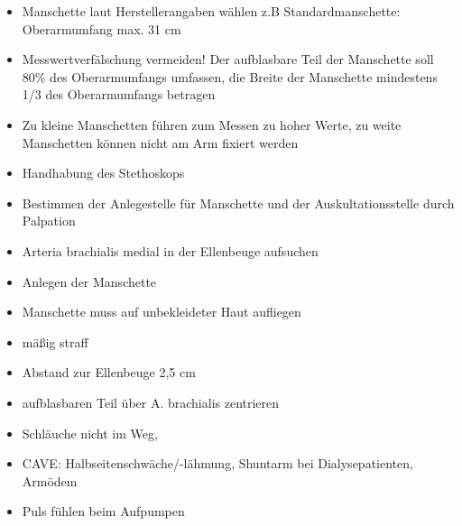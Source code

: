 \documentclass{article}
\begin{document}
\begin{itemize}
\item Manschette laut Herstellerangaben w\"ahlen z.B Standardmanschette:
Oberarmumfang max. 31 cm

\item Messwertverf\"alschung vermeiden! Der aufblasbare Teil der
Manschette soll 80\% des Oberarmumfangs umfassen, die Breite der
Manschette mindestens 1/3 des Oberarmumfangs betragen

\item Zu kleine Manschetten f\"uhren zum Messen zu hoher Werte, zu weite
Manschetten k\"onnen nicht am Arm fixiert werden

\end{itemize}
\begin{itemize}
\item Handhabung des Stethoskops

\item Bestimmen der Anlegestelle f\"ur Manschette und der
Auskultationsstelle durch Palpation

\end{itemize}
\begin{itemize}
\item Arteria brachialis medial in der Ellenbeuge aufsuchen

\end{itemize}
\begin{itemize}
\item Anlegen der Manschette

\end{itemize}
\begin{itemize}
\item Manschette muss auf unbekleideter Haut aufliegen

\item m\"a{\ss}ig straff

\item Abstand zur Ellenbeuge 2,5 cm

\item aufblasbaren Teil \"uber A. brachialis zentrieren

\item Schl\"auche nicht im Weg,

\item CAVE: Halbseitenschw\"ache/-l\"ahmung, Shuntarm bei
Dialysepatienten, Arm\"odem

\end{itemize}
\begin{itemize}
\item Puls f\"uhlen beim Aufpumpen

\end{itemize}
\end{document}
